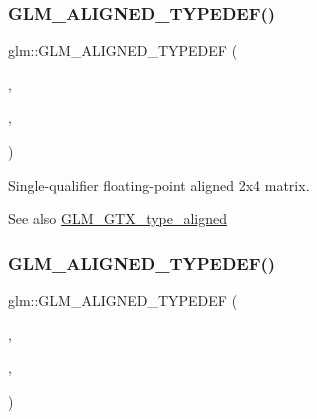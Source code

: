 \subsubsection{\texorpdfstring{G\+L\+M\+\_\+\+A\+L\+I\+G\+N\+E\+D\+\_\+\+T\+Y\+P\+E\+D\+E\+F()}{GLM\_ALIGNED\_TYPEDEF()}\hspace{0.1cm}{\footnotesize\ttfamily [186/209]}}
{\footnotesize\ttfamily glm\+::\+G\+L\+M\+\_\+\+A\+L\+I\+G\+N\+E\+D\+\_\+\+T\+Y\+P\+E\+D\+EF (\begin{DoxyParamCaption}\item[{\mbox{\hyperlink{group__gtc__type__precision_ga56deb277c1d5c1f42a80982372b4ed6c}{f32mat2x4}}}]{,  }\item[{aligned\+\_\+f32mat2x4}]{,  }\item[{16}]{ }\end{DoxyParamCaption})}

Single-\/qualifier floating-\/point aligned 2x4 matrix. \begin{DoxySeeAlso}{See also}
\mbox{\hyperlink{group__gtx__type__aligned}{G\+L\+M\+\_\+\+G\+T\+X\+\_\+type\+\_\+aligned}} 
\end{DoxySeeAlso}
\mbox{\label{group__gtx__type__aligned_gac09663c42566bcb58d23c6781ac4e85a}} 
\subsubsection{\texorpdfstring{G\+L\+M\+\_\+\+A\+L\+I\+G\+N\+E\+D\+\_\+\+T\+Y\+P\+E\+D\+E\+F()}{GLM\_ALIGNED\_TYPEDEF()}\hspace{0.1cm}{\footnotesize\ttfamily [187/209]}}
{\footnotesize\ttfamily glm\+::\+G\+L\+M\+\_\+\+A\+L\+I\+G\+N\+E\+D\+\_\+\+T\+Y\+P\+E\+D\+EF (\begin{DoxyParamCaption}\item[{\mbox{\hyperlink{group__gtc__type__precision_ga924b933089d954df062aa8d0735fc005}{f32mat3x2}}}]{,  }\item[{aligned\+\_\+f32mat3x2}]{,  }\item[{16}]{ }\end{DoxyParamCaption})}


